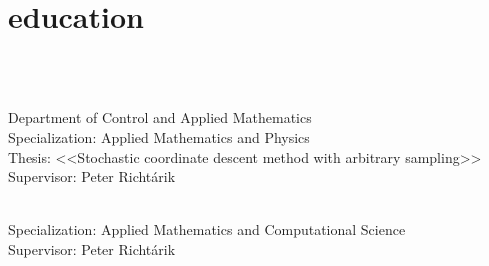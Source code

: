 \documentclass[]{deedy-resume-openfont}
\begin{document}
\begin{minipage}[t]{0.66\textwidth} 

\section{education}
\\
\begin{tightemize}
	\item
{}\\
Department of Control and Applied Mathematics\\
Specialization: Applied Mathematics and Physics\\
Thesis: <<Stochastic coordinate descent method with arbitrary sampling>>\\
\normalsize Supervisor: Peter Richt{\'a}rik\\
\vspace{0.1em}
\end{tightemize}
\begin{tightemize}
\item
{}\\
Specialization: Applied Mathematics and Computational Science\\
\normalsize Supervisor:   Peter Richt{\'a}rik \\
\end{tightemize}
\vspace{0.1em}

\end{minipage}
\end{document}
